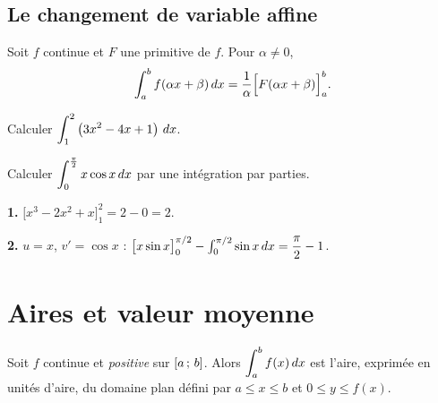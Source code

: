 \subsection{Le changement de variable affine}

\begin{propriete}
Soit $f$ continue et $F$ une primitive de $f$. Pour $\alpha \neq 0$,
\[
  \int_{a}^{b} f(\alpha x + \beta)\,dx
  = \frac{1}{\alpha}\Bigl[F(\alpha x + \beta)\Bigr]_{a}^{b} .
\]
\end{propriete}

\begin{entrainement}
\exo[\niveau{1}] Calculer $\displaystyle\int_{1}^{2}\left(3x^{2}-4x+1\right)\,dx$.

\exo[\niveau{2}] Calculer $\displaystyle\int_{0}^{\frac{\pi}{2}} x\cos x \,dx$
par une intégration par parties.
\end{entrainement}

\begin{corrige}
\textbf{1.} $\bigl[x^{3}-2x^{2}+x\bigr]_{1}^{2} = 2-0 = 2$.

\textbf{2.} $u=x$, $v'=\cos x$ : $\bigl[x\sin x\bigr]_{0}^{\pi/2}
- \int_{0}^{\pi/2}\sin x\,dx = \dfrac{\pi}{2} - 1$.
\end{corrige}

\section{Aires et valeur moyenne}

\begin{theoreme}
Soit $f$ continue et \emph{positive} sur $\left[a\,;\,b\right]$. Alors
$\displaystyle\int_{a}^{b} f(x)\,dx$ est l'aire, exprimée en unités d'aire, du
domaine plan défini par $a \leq x \leq b$ et $0 \leq y \leq f(x)$.
\end{theoreme}

